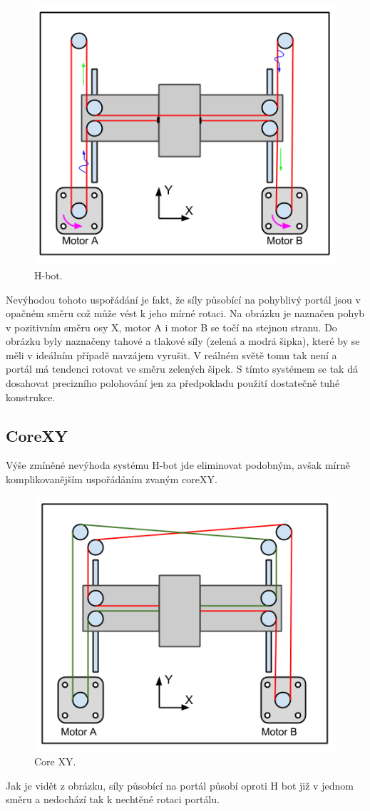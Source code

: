 \begin{figure}[h!]
  \centering
    \includegraphics[width=0.6\linewidth]{obrazky/Hbot.png}%
    \caption{H-bot.}
    \label{fig:Hbot}
\end{figure}

Nevýhodou tohoto uspořádání je fakt, že síly působící na pohyblivý portál jsou v opačném směru což může vést k jeho mírné rotaci. Na obrázku je naznačen pohyb v pozitivním směru osy X, motor A i motor B se točí na stejnou stranu. Do obrázku byly naznačeny tahové a tlakové síly (zelená a modrá šipka), které by se měli v ideálním případě navzájem vyrušit. V reálném světě tomu tak není a portál má tendenci rotovat ve směru zelených šipek.
 S tímto systémem se tak dá dosahovat precizního polohování jen za předpokladu použití dostatečně tuhé konstrukce.





\subsection{CoreXY}
Výše zmíněné nevýhoda systému H-bot jde eliminovat podobným, avšak mírně komplikovanějším uspořádáním zvaným coreXY. 

\begin{figure}[h!]
  \centering
    \includegraphics[width=0.6\linewidth]{obrazky/coreXY.png}%
    \caption{Core XY.}
    \label{fig:coreXY}
\end{figure}

Jak je vidět z obrázku, síly působící na portál působí oproti H bot již v jednom směru a nedochází tak k nechtěné rotaci portálu. 

